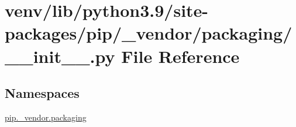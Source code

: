 \hypertarget{venv_2lib_2python3_89_2site-packages_2pip_2__vendor_2packaging_2____init_____8py}{}\section{venv/lib/python3.9/site-\/packages/pip/\+\_\+vendor/packaging/\+\_\+\+\_\+init\+\_\+\+\_\+.py File Reference}
\label{venv_2lib_2python3_89_2site-packages_2pip_2__vendor_2packaging_2____init_____8py}
\subsection*{Namespaces}
\begin{DoxyCompactItemize}
\item 
 \hyperlink{namespacepip_1_1__vendor_1_1packaging}{pip.\+\_\+vendor.\+packaging}
\end{DoxyCompactItemize}
